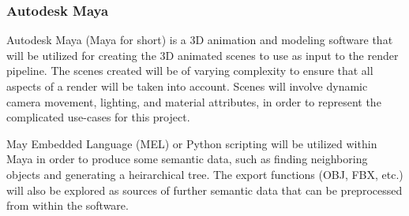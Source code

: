 \documentclass[conference]{IEEEtran}
\begin{document}
\subsubsection{Autodesk Maya}
Autodesk Maya (Maya for short) is a 3D animation and modeling software that will be utilized
for creating the 3D animated scenes to use as input to the render pipeline.
The scenes created will be of varying complexity to ensure that all aspects of a
render will be taken into account.
Scenes will involve dynamic camera movement, lighting, and material attributes, in order
to represent the complicated use-cases for this project.

May Embedded Language (MEL) or Python scripting
will be utilized within Maya in order to produce some semantic data, such as finding neighboring
objects and generating a heirarchical tree. The export functions (OBJ, FBX, etc.) will also be explored
as sources of further semantic data that can be preprocessed from within the software.
\end{document}
